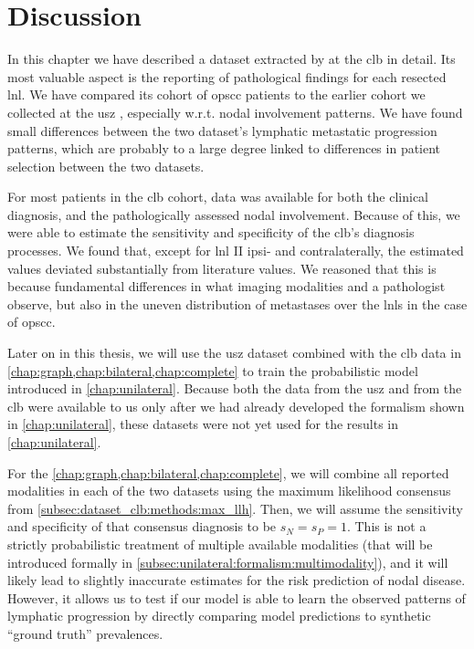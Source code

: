 \documentclass[\relativeRoot/main.tex]{subfiles}
\begin{document}
\section{Discussion}
\label{sec:dataset_clb:discussion}

In this chapter we have described a dataset extracted by  at the \gls{clb} in detail. Its most valuable aspect is the reporting of pathological findings for each resected \gls{lnl}. We have compared its cohort of \gls{opscc} patients to the earlier cohort we collected at the \gls{usz} \cite{ludwig_detailed_2022}, especially w.r.t. nodal involvement patterns. We have found small differences between the two dataset's lymphatic metastatic progression patterns, which are probably to a large degree linked to differences in patient selection between the two datasets.

For most patients in the \gls{clb} cohort, data was available for both the clinical diagnosis, and the pathologically assessed nodal involvement. Because of this, we were able to estimate the sensitivity and specificity of the \gls{clb}'s diagnosis processes. We found that, except for \gls{lnl} II ipsi- and contralaterally, the estimated values deviated substantially from literature values. We reasoned that this is because fundamental differences in what imaging modalities and a pathologist observe, but also in the uneven distribution of metastases over the \glspl{lnl} in the case of \gls{opscc}.

Later on in this thesis, we will use the \gls{usz} dataset combined with the \gls{clb} data in \cref{chap:graph,chap:bilateral,chap:complete} to train the probabilistic model introduced in \cref{chap:unilateral}. Because both the data from the \gls{usz} and from the \gls{clb} were available to us only after we had already developed the formalism shown in \cref{chap:unilateral}, these datasets were not yet used for the results in \cref{chap:unilateral}.

For the \cref{chap:graph,chap:bilateral,chap:complete}, we will combine all reported modalities in each of the two datasets using the maximum likelihood consensus from \cref{subsec:dataset_clb:methods:max_llh}. Then, we will assume the sensitivity and specificity of that consensus diagnosis to be $s_N = s_P = 1$. This is not a strictly probabilistic treatment of multiple available modalities (that will be introduced formally in \cref{subsec:unilateral:formalism:multimodality}), and it will likely lead to slightly inaccurate estimates for the risk prediction of nodal disease. However, it allows us to test if our model is able to learn the observed patterns of lymphatic progression by directly comparing model predictions to synthetic ``ground truth'' prevalences.
\end{document}
